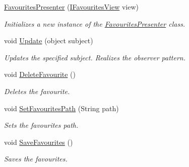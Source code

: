 \begin{DoxyCompactItemize}
\item 
\hyperlink{class_assessment___two___logic_1_1_presenter_1_1_favourites_presenter_aa254a51ff5bb5a7173a355331c28ed26}{FavouritesPresenter} (\hyperlink{interface_assessment___two___logic_1_1_interfaces_1_1_i_favourites_view}{IFavouritesView} view)
\begin{DoxyCompactList}\small\item\em Initializes a new instance of the \hyperlink{class_assessment___two___logic_1_1_presenter_1_1_favourites_presenter}{FavouritesPresenter} class. \item\end{DoxyCompactList}\item 
void \hyperlink{class_assessment___two___logic_1_1_presenter_1_1_favourites_presenter_a4ba22642aa4a323a5778b94683534892}{Update} (object subject)
\begin{DoxyCompactList}\small\item\em Updates the specified subject. Realizes the observer pattern. \item\end{DoxyCompactList}\item 
void \hyperlink{class_assessment___two___logic_1_1_presenter_1_1_favourites_presenter_a537b450637a95b26844f297d4a06c990}{DeleteFavourite} ()
\begin{DoxyCompactList}\small\item\em Deletes the favourite. \item\end{DoxyCompactList}\item 
void \hyperlink{class_assessment___two___logic_1_1_presenter_1_1_favourites_presenter_a462f04ce0d3ed9e3233c2da978d792b4}{SetFavouritesPath} (String path)
\begin{DoxyCompactList}\small\item\em Sets the favourites path. \item\end{DoxyCompactList}\item 
void \hyperlink{class_assessment___two___logic_1_1_presenter_1_1_favourites_presenter_ae0f1ff5dd201ec5a78cbf284526e7787}{SaveFavourites} ()
\begin{DoxyCompactList}\small\item\em Saves the favourites. \item\end{DoxyCompactList}\end{DoxyCompactItemize}


